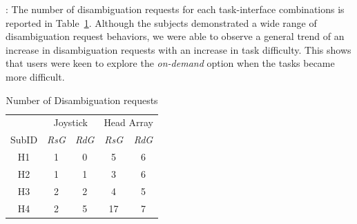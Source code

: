 \documentclass[conference]{IEEEtran}
\begin{document}
\vspace{0.1cm}
: The number of disambiguation requests for each task-interface combinations is reported in Table~\ref{ONDEMAND}. Although the subjects demonstrated a wide range of disambiguation request behaviors, we were able to observe a general trend of an increase in disambiguation requests with an increase in task difficulty. This shows that users were keen to explore the \textit{on-demand} option when the tasks became more difficult. 

%		


\begin{table}
	\centering
 \begin{tabular}{ccccc}
	\toprule
	&\multicolumn{2}{c}{Joystick}
	&
	\multicolumn{2}{c}{Head Array} \\\cmidrule(r){2-3}\cmidrule(l){4-5}
	SubID &\textit{RsG}& \textit{RdG}    & \textit{RsG} &\textit{RdG}      \\
	\bottomrule
	H1 &1& 0   & 5 & 6  \\
	\bottomrule
	H2 &1& 1    & 3 & 6      \\
	\bottomrule
	H3 &2& 2    & 4 &5    \\
	\bottomrule
	H4 &2& 5    & 17 &7   \\
	\bottomrule
\end{tabular}
\vspace{.2cm}
\caption{Number of Disambiguation requests}
\label{ONDEMAND}
\end{table}
\end{document}
